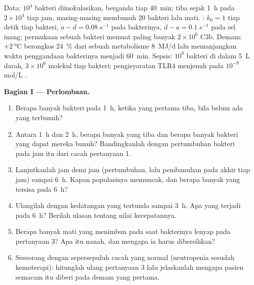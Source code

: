 \begin{problem}
\label{pb:b3:innate-immunity:1}
Data: $10^{4}$ bakteri diinokulasikan, berganda tiap \qty{40}{min};
 tiba sejak \qty{1}{h} pada $2\times 10^{4}$ tiap jam, masing-masing
membunuh $20$ bakteri lalu mati. : $k_{0} = 1$ tiap detik
tiap bakteri, $a - d = \qty{0.08}{s^{-1}}$ pada bakterinya, $d - a =
\qty{0.1}{s^{-1}}$ pada sel inang; permukaan sebuah bakteri memuat paling banyak
$2\times 10^{6}$ C3b. Demam: $+\qty{2}{\celsius}$ berongkos \qty{24}{\%} dari
sebuah metabolisme \qty{8}{MJ/d} lalu memanjangkan waktu penggandaan bakterinya
menjadi \qty{60}{min}. Sepsis: $10^{9}$ bakteri di dalam \qty{5}{L} darah,
$3\times 10^{6}$ molekul  tiap bakteri; pengisyaratan TLR4
menjenuh pada $10^{-9}$ mol/L .

\medskip
\noindent\textbf{Bagian I --- Perlombaan.}
\begin{enumerate}
  \item Berapa banyak bakteri pada \qty{1}{h}, ketika  yang pertama
        tiba, bila belum ada yang terbunuh?
  \item Antara \qty{1}{h} dan \qty{2}{h}, berapa banyak  yang tiba
        dan berapa banyak bakteri yang dapat mereka bunuh? Bandingkanlah dengan
        pertumbuhan bakteri pada jam itu dari cacah pertanyaan 1.
  \item Lanjutkanlah jam demi jam (pertumbuhan, lalu pembunuhan pada akhir tiap
        jam) sampai \qty{6}{h}. Kapan populasinya memuncak, dan berapa banyak
        yang tersisa pada \qty{6}{h}?
  \item Ulangilah dengan kedatangan  yang tertunda sampai \qty{3}{h}. Apa
        yang terjadi pada \qty{6}{h}? Berilah ulasan tentang nilai kecepatannya.
  \item Berapa banyak  mati yang menimbun pada saat bakterinya
        lenyap pada pertanyaan 3? Apa itu nanah, dan mengapa ia harus
        dibersihkan?
  \item Seseorang dengan sepersepuluh cacah  yang normal
        (neutropenia sesudah kemoterapi): hitunglah ulang pertanyaan 3 lalu
        jelaskanlah mengapa pasien semacam itu diberi  pada demam
        yang pertama.
\end{enumerate}


\end{problem}
